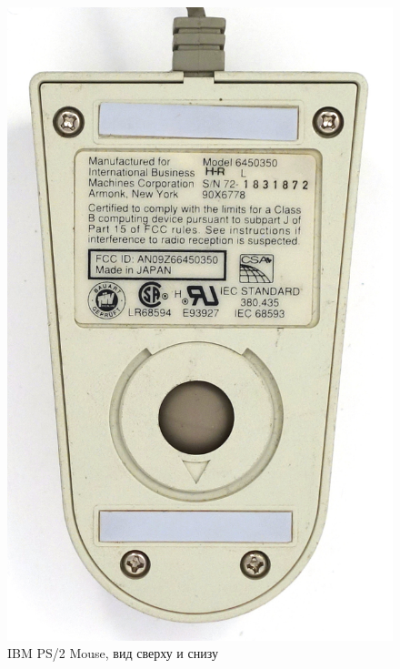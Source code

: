 \documentclass[11pt, a4paper]{article}
\begin{document}
\begin{figure}[h]
    \includegraphics[scale=0.4]{1987_ibm_ps2_mouse/num2.JPG}
    \caption{IBM PS/2 Mouse, вид сверху и снизу}
    \label{fig:IMBPS2TopBottom}
\end{figure}
\end{document}
